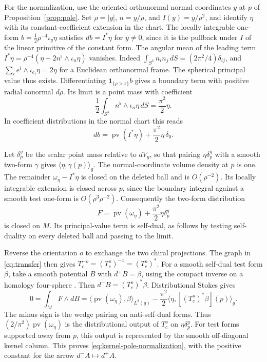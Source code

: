\documentclass[11pt,letterpaper]{article}
\numberwithin{equation}{section}
\begin{document}
For the normalization, use the oriented orthonormal normal coordinates
\(y\) at \(p\) of Proposition~\ref{prop:pole}. Set \(\rho=|y|\),
\(n=y/\rho\), and \(I(y)=y/\rho^2\), and identify \(\eta\) with its
constant-coefficient extension in the chart. The locally integrable
one-form \(b=\tfrac12\rho^{-4}\iota_y\eta\) satisfies
\(db=I^*\eta\) for \(y\ne0\), since it is the pullback under \(I\) of the
linear primitive of the constant form. The angular mean of the leading term
\(I^*\eta=\rho^{-4}(\eta-2n^\flat\wedge\iota_n\eta)\) vanishes.
Indeed \(\int_{S^3}n_i n_j\,dS=(2\pi^2/4)\delta_{ij}\), and
\(\sum_i e^i\wedge\iota_{e_i}\eta=2\eta\) for a Euclidean orthonormal
frame. The spherical principal value thus exists. Differentiating
\(\mathbf{1}_{\{\rho>\varepsilon\}}b\) gives a boundary term with
positive radial conormal \(d\rho\). Its limit is a point mass with
coefficient
\[
 \frac12\int_{S^3}n^\flat\wedge\iota_n\eta\,dS
 =\frac{\pi^2}{2}\eta .
\]
In coefficient distributions in the normal chart this reads
\[
 db=\operatorname{pv}(I^*\eta)+\frac{\pi^2}{2}\eta\,\delta_0 .
\]

Let \(\delta_p^g\) be the scalar point mass relative to \(dV_g\), so
that pairing \(\eta\delta_p^g\) with a smooth two-form \(\gamma\)
gives \(\langle\eta,\gamma(p)\rangle_g\). The normal-coordinate volume
density at \(p\) is one. The remainder \(\omega_\eta-I^*\eta\) is closed
on the deleted ball and is \(O(\rho^{-2})\). Its locally integrable
extension is closed across \(p\), since the boundary integral against a
smooth test one-form is \(O(\rho^3\rho^{-2})\). Consequently the
two-form distribution
\[
 F=\operatorname{pv}(\omega_\eta)+\frac{\pi^2}{2}\eta\delta_p^g
\]
is closed on \(M\). Its principal-value term is self-dual, as follows by
testing self-duality on every deleted ball and passing to the limit.

Reverse the orientation \(o\) to exchange the two chiral projections.
The graph in \eqref{eq:transfer} then gives
\(T_c^{-o}=(T_c^o)^{-1}=(T_c^o)^*\).
For a smooth self-dual test form \(\beta\), take a smooth potential \(B\)
with \(d^+B=\beta\), using the compact inverse on a homology
four-sphere \cite[\S2(ii), (2.9)--(2.13)]{DonaldsonSullivan1989}.
Then \(d^-B=(T_c^o)^*\beta\). Distributional Stokes gives
\[
 0=\int_M F\wedge dB
  =\big\langle\operatorname{pv}(\omega_\eta),\beta\big\rangle_{L^2(g)}
   -\frac{\pi^2}{2}\big\langle\eta,[(T_c^o)^*\beta](p)\big\rangle_g .
\]
The minus sign is the wedge pairing on anti-self-dual forms. Thus
\((2/\pi^2)\operatorname{pv}(\omega_\eta)\) is the distributional output
of \(T_c^o\) on \(\eta\delta_p^g\). For test forms supported away from
\(p\), this output is represented by the smooth off-diagonal kernel
column. This proves \eqref{eq:kernel-pole-normalization}, with the
positive constant for the arrow \(d^-A\mapsto d^+A\).
\end{document}
